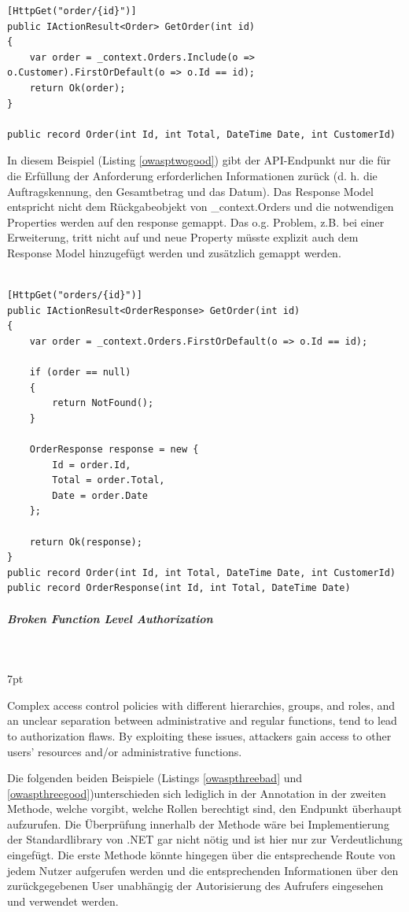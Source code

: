 \documentclass[notitlepage, hidelinks]{article}
\newenvironment{formal}{%
  \def\FrameCommand{%
    \hspace{1pt}%
    {\color{black}\vrule width 2pt}%
    {\color{formalshade}\vrule width 4pt}%
    \colorbox{formalshade}%
  }%
  \MakeFramed{\advance\hsize-\width\FrameRestore}%
  \noindent\hspace{-4.55pt}%
  \begin{adjustwidth}{}{7pt}%
  \vspace{2pt}\vspace{2pt}%
}
{%
  \vspace{2pt}\end{adjustwidth}\endMakeFramed%
}
\begin{document}
\begin{lstlisting}[language={[Sharp]C},frame=single,caption=Negativbeispiel Excessive Data Exposure,label=owasptwobad]
[HttpGet("order/{id}")]
public IActionResult<Order> GetOrder(int id)
{
    var order = _context.Orders.Include(o => o.Customer).FirstOrDefault(o => o.Id == id);
    return Ok(order);
}

public record Order(int Id, int Total, DateTime Date, int CustomerId)
\end{lstlisting}

In diesem Beispiel (Listing \ref{owasptwogood}) gibt der API-Endpunkt nur die für die Erfüllung der Anforderung erforderlichen Informationen zurück (d. h. die Auftragskennung, den Gesamtbetrag und das Datum). Das Response Model entspricht nicht dem Rückgabeobjekt von \_context.Orders und die notwendigen Properties werden auf den response gemappt. Das o.g. Problem, z.B. bei einer Erweiterung, tritt nicht auf und neue Property müsste explizit auch dem Response Model hinzugefügt werden und zusätzlich gemappt werden.

\begin{lstlisting}[language={[Sharp]C},frame=single,caption=Positivbeispiel Excessive Data Exposure,label=owasptwogood]

[HttpGet("orders/{id}")]
public IActionResult<OrderResponse> GetOrder(int id)
{
    var order = _context.Orders.FirstOrDefault(o => o.Id == id);

    if (order == null)
    {
        return NotFound();
    }

    OrderResponse response = new {
        Id = order.Id,
        Total = order.Total,
        Date = order.Date
    };

    return Ok(response);
}
public record Order(int Id, int Total, DateTime Date, int CustomerId)
public record OrderResponse(int Id, int Total, DateTime Date)
\end{lstlisting}


\subparagraph{Broken Function Level Authorization} \mbox{} \\
\begin{formal}
Complex access control policies with different hierarchies, groups, and roles, and an unclear separation between administrative and regular functions, tend to lead to authorization flaws. By exploiting these issues, attackers gain access to other users’ resources and/or administrative functions.
\end{formal}

Die folgenden beiden Beispiele (Listings \ref{owaspthreebad} und \ref{owaspthreegood})unterschieden sich lediglich in der Annotation in der zweiten Methode, welche vorgibt, welche Rollen berechtigt sind, den Endpunkt überhaupt aufzurufen. Die Überprüfung innerhalb der Methode wäre bei Implementierung der Standardlibrary von .NET gar nicht nötig und ist hier nur zur Verdeutlichung eingefügt. Die erste Methode könnte hingegen über die entsprechende Route von jedem Nutzer aufgerufen werden und die entsprechenden Informationen über den zurückgegebenen User unabhängig der Autorisierung des Aufrufers eingesehen und verwendet werden.
\end{document}
